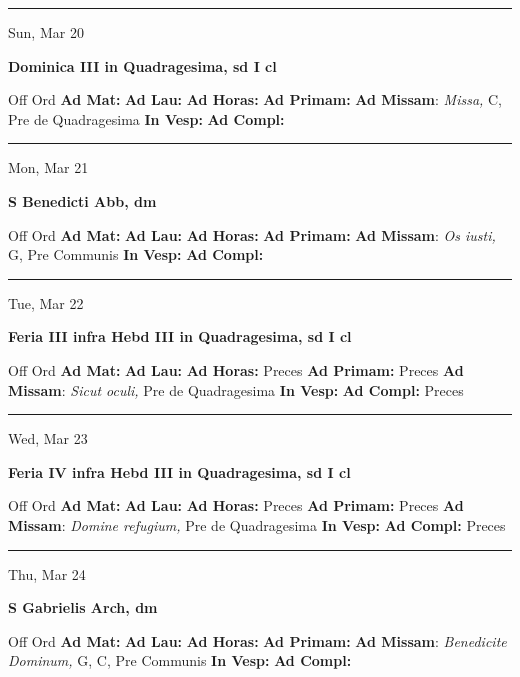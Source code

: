 \documentclass[letterpaper, 10pt]{article}
\begin{document}
\hrule
\begin{center}
Sun, Mar 20
\end{center}\textbf{ \large Dominica III in Quadragesima, \textnormal{\normalsize sd I cl}}
\begin{justify}
Off Ord
\textbf{Ad Mat: }
\textbf{Ad Lau: }
\textbf{Ad Horas: }
\textbf{Ad Primam: }
\textbf{Ad Missam}: \textit{Missa,} C, Pre de Quadragesima
\textbf{In Vesp: }
\textbf{Ad Compl: }\end{justify}



\hrule
\begin{center}
Mon, Mar 21
\end{center}\textbf{ \large S Benedicti Abb, \textnormal{\normalsize dm}}
\begin{justify}
Off Ord
\textbf{Ad Mat: }
\textbf{Ad Lau: }
\textbf{Ad Horas: }
\textbf{Ad Primam: }
\textbf{Ad Missam}: \textit{Os iusti,} G, Pre Communis
\textbf{In Vesp: }
\textbf{Ad Compl: }\end{justify}



\hrule
\begin{center}
Tue, Mar 22
\end{center}\textbf{ \large Feria III infra Hebd III in Quadragesima, \textnormal{\normalsize sd I cl}}
\begin{justify}
Off Ord
\textbf{Ad Mat: }
\textbf{Ad Lau: }
\textbf{Ad Horas: }Preces
\textbf{Ad Primam: }Preces
\textbf{Ad Missam}: \textit{Sicut oculi,} Pre de Quadragesima
\textbf{In Vesp: }
\textbf{Ad Compl: }Preces\end{justify}



\hrule
\begin{center}
Wed, Mar 23
\end{center}\textbf{ \large Feria IV infra Hebd III in Quadragesima, \textnormal{\normalsize sd I cl}}
\begin{justify}
Off Ord
\textbf{Ad Mat: }
\textbf{Ad Lau: }
\textbf{Ad Horas: }Preces
\textbf{Ad Primam: }Preces
\textbf{Ad Missam}: \textit{Domine refugium,} Pre de Quadragesima
\textbf{In Vesp: }
\textbf{Ad Compl: }Preces\end{justify}



\hrule
\begin{center}
Thu, Mar 24
\end{center}\textbf{ \large S Gabrielis Arch, \textnormal{\normalsize dm}}
\begin{justify}
Off Ord
\textbf{Ad Mat: }
\textbf{Ad Lau: }
\textbf{Ad Horas: }
\textbf{Ad Primam: }
\textbf{Ad Missam}: \textit{Benedicite Dominum,} G, C, Pre Communis
\textbf{In Vesp: }
\textbf{Ad Compl: }\end{justify}
\end{document}
